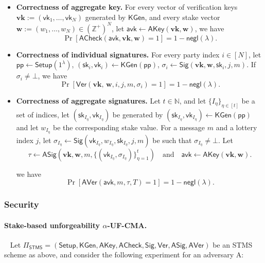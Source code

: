 \documentclass{article}
\newcommand{\sk}[0]{\mathsf{sk}}
\newcommand{\vk}[0]{\mathsf{vk}}
\newcommand{\ZZ}[0]{\mathbb{Z}}
\begin{document}
\begin{itemize}
  \item \textbf{Correctness of aggregate key.}
        For  every vector of verification keys
$\mathbf{vk} := (\vk_1,\dots,\vk_N)$ generated by $\mathsf{KGen}$, and every stake vector
$\mathbf{w} := (w_1,\dots,w_N) \in(\ZZ^+)^{N}$, let $\mathsf{avk} \leftarrow \mathsf{AKey}(\mathbf{vk}, \mathbf{w})$, we have 
        \[
          \Pr[\mathsf{ACheck}(\mathsf{avk}, \mathbf{vk}, \mathbf{w}) = 1] = 1-\mathsf{negl}(\lambda).
        \]

  \item \textbf{Correctness of individual signatures.}
        For every party index $i \in [N]$, let $\mathsf{pp}\leftarrow\mathsf{Setup}(1^\lambda)$, 
        $(\sk_i, \vk_i) \leftarrow \mathsf{KGen}(\mathsf{pp})$,
         $\sigma_i \leftarrow \mathsf{Sig}(\mathbf{vk}, \mathbf{w}, \sk_i, j, m)$. If $\sigma_i \neq \bot$, we have
        \[
          \Pr[\mathsf{Ver}(\mathbf{vk},\, \mathbf{w}, i, j, m, \sigma_i) = 1] = 1 -\mathsf{negl}(\lambda).
        \]

  \item \textbf{Correctness of aggregate signatures.}
        Let $t \in \mathbb{N}$, and let $\{I_\eta\}_{\eta \in[t]}$ be a set of indices, let $(\sk_{I_\eta}, \vk_{I_\eta})$ be generated by
        $(\sk_{I_\eta}, \vk_{I_\eta}) \leftarrow \mathsf{KGen}(\mathsf{pp})$ and let $w_{I_\eta}$ be the corresponding stake value.
        For a message $m$ and a lottery index $j$, let
        $\sigma_{I_\eta} \leftarrow \mathsf{Sig}(\vk_{I_\eta}, w_{I_\eta}, \sk_{I_\eta}, j, m)$ be such that $\sigma_{I_\eta} \neq \bot$.
        Let
        \[
          \tau \leftarrow \mathsf{ASig}(\mathbf{vk}, \mathbf{w}, m, \{(\vk_{I_\eta},\sigma_{I_\eta})\}_{\eta=1}^{t})
          \quad\text{and}\quad
          \mathsf{avk} \leftarrow \mathsf{AKey}(\mathbf{vk}, \mathbf{w}).
        \]

        we have 
        \[
          \Pr[\mathsf{AVer}(\mathsf{avk}, m, \tau, T) = 1] = 1 -\mathsf{negl}(\lambda).
        \]
\end{itemize}



\subsubsection{Security}


\paragraph{Stake-based unforgeability $\alpha$-\textsf{UF-CMA}.} \ 
\newline
Let $\Pi_{\mathsf{STMS}}
  =
  (\mathsf{Setup}, \mathsf{KGen}, \mathsf{AKey}, \mathsf{ACheck},
   \mathsf{Sig}, \mathsf{Ver}, \mathsf{ASig}, \mathsf{AVer})$ be an STMS scheme as above, and consider the following experiment for an adversary A:
   
\end{document}
